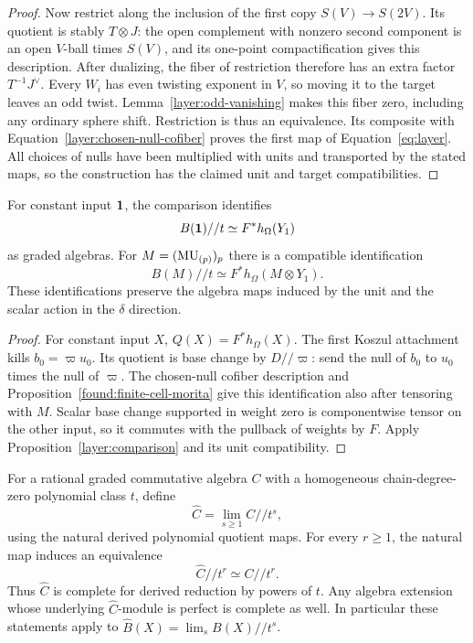 \begin{proof}
Now restrict along the inclusion of the first copy
$S(V)\to S(2V)$. Its quotient is stably $T\otimes J$:
the open complement with nonzero second component is an open
$V$-ball times $S(V)$, and its one-point compactification gives
this description. After dualizing, the fiber of restriction
therefore has an extra factor $T^{-1}J^\vee$. Every $W_i$ has
even twisting exponent in $V$, so moving it to the target leaves
an odd twist. Lemma~\ref{layer:odd-vanishing} makes this fiber
zero, including any ordinary sphere shift. Restriction is thus an
equivalence. Its composite with
Equation~\eqref{layer:chosen-null-cofiber} proves the first map
of Equation~\eqref{eq:layer}. All choices of nulls have been
multiplied with units and transported by the stated maps, so the
construction has the claimed unit and target compatibilities.
\end{proof}

\begin{corollary}
\label{layer:first-koszul}
For constant input $\mathbf 1$, the comparison identifies
\[
 B(\mathbf 1)//t\simeq F^*h_\Omega(Y_1)
\]
as graded algebras. For $M=(\mathrm{MU}_{(p)})_p$ there is a compatible
identification
\[
 B(M)//t\simeq F^*h_\Omega(M\otimes Y_1).
\]
These identifications preserve the algebra maps induced by the
unit and the scalar action in the $\delta$ direction.
\end{corollary}

\begin{proof}
For constant input $X$, $Q(X)=F^*h_\Omega(X)$. The first Koszul
attachment kills $b_0=\varpi u_0$. Its quotient is base change by
$D//\varpi$: send the null of $b_0$ to $u_0$ times the null of
$\varpi$. The chosen-null cofiber description and
Proposition~\ref{found:finite-cell-morita} give this identification also
after tensoring with $M$. Scalar base change supported in weight
zero is componentwise tensor on the other input, so it commutes
with the pullback of weights by $F$. Apply
Proposition~\ref{layer:comparison} and its unit compatibility.
\end{proof}

\begin{lemma}
\label{layer:completion}
For a rational graded commutative algebra $C$ with a homogeneous
chain-degree-zero polynomial class $t$, define
\[
 \widehat C=\lim_{s\geq1}C//t^s,
\]
using the natural derived polynomial quotient maps. For every
$r\geq1$, the natural map induces an equivalence
\[
 \widehat C//t^r\simeq C//t^r.
\]
Thus $\widehat C$ is complete for derived reduction by powers of
$t$. Any algebra extension whose underlying $\widehat C$-module
is perfect is complete as well. In particular these statements
apply to
$\widehat B(X)=\lim_s B(X)//t^s$.
\end{lemma}


